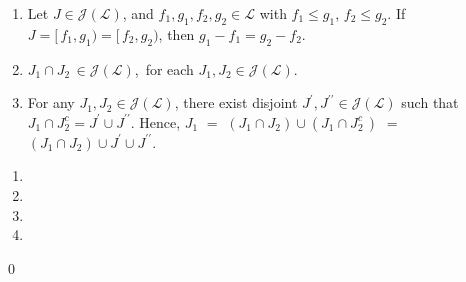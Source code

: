 \begin{lemma}
\begin{enumerate}
\item
	Let $J \in \mathscr{J}\!(\mathcal{L})$, and $f_{1}, g_{1}, f_{2}, g_{2} \in \mathcal{L}$
	with $f_{1} \leq g_{1}$, $f_{2} \leq g_{2}$.
	If $J = [\,f_{1},g_{1}) = [\,f_{2},g_{2})$, then $g_{1} - f_{1} = g_{2} - f_{2}$.
\item
	$J_{1} \cap J_{2} \,\in \mathscr{J}\!(\mathcal{L})$,\, for each $J_{1}, J_{2} \in \mathscr{J}\!(\mathcal{L})$.
\item
	For any $J_{1}, J_{2} \in \mathscr{J}\!(\mathcal{L})$,
	there exist disjoint $J^{\prime}, J^{\prime\prime} \in \mathscr{J}\!(\mathcal{L})$ such that
	$J_{1} \cap J_{2}^{c} = J^{\prime} \cup J^{\prime\prime}$.
	\vskip 0.05cm
	Hence,
	$J_{1}$ $=$ $(J_{1} \cap J_{2}) \cup (J_{1} \cap J_{2}^{c}\,)$
	$=$ $(J_{1} \cap J_{2}) \cup J^{\prime} \cup J^{\prime\prime}$.
\end{enumerate}
\end{lemma}
\proof
\begin{enumerate}
\item
\item
\item
\item
\end{enumerate}
\qed


